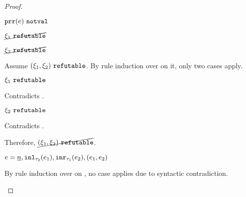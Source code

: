 \begin{proof}
\begin{byCases}
\begin{pfsteps*}
    \item $\mathtt{prr}(e) ~\mathtt{notval}$  
    \item $\cancel{\xi_1 ~\mathtt{refutable}}$  
    \item $\cancel{\xi_2 ~\mathtt{refutable}}$  
    \end{pfsteps*}
    Assume $(\xi_1 , \xi_2) ~\mathtt{refutable}$. By rule induction over  on it, only two cases apply.
    \begin{byCases}
    \item[\text{(\ref{rule:RXPairL})}]
        \begin{pfsteps*}
        \item $\xi_1 ~\mathtt{refutable}$ 
        \end{pfsteps*}
        Contradicts .
    \item[\text{(\ref{rule:RXPairR})}]
        \begin{pfsteps*}
        \item $\xi_2 ~\mathtt{refutable}$ 
        \end{pfsteps*}
        Contradicts .
    \end{byCases}
    Therefore, $\cancel{(\xi_1 , \xi_2) ~\mathtt{refutable}}$.
\item
    \begin{pfsteps*}
    \item $e=\underline{n},\mathtt{inl}_{\tau_2}({e_1}),\mathtt{inr}_{\tau_1}({e_2}),(e_1 , e_2)$ 
    \end{pfsteps*}
    By rule induction over  on , no case applies due to syntactic contradiction.
\end{byCases}
\resetpfcounter
\end{proof}

